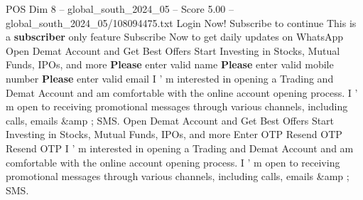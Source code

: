 \begin{textsample}{POS Dim 8 – global\_south\_2024\_05 – Score 5.00 – global\_south\_2024\_05/108094475.txt}
Login Now!
Subscribe to continue This is a \textbf{subscriber} only feature Subscribe Now to get daily updates on WhatsApp Open Demat Account and Get Best Offers Start Investing in Stocks, Mutual Funds, IPOs, and more \textbf{Please} enter valid name \textbf{Please} enter valid mobile number \textbf{Please} enter valid email I ' m interested in opening a Trading and Demat Account and am comfortable with the online account opening process.
I ' m open to receiving promotional messages through various channels, including calls, emails \&amp ; SMS.
Open Demat Account and Get Best Offers Start Investing in Stocks, Mutual Funds, IPOs, and more Enter OTP Resend OTP Resend OTP I ' m interested in opening a Trading and Demat Account and am comfortable with the online account opening process.
I ' m open to receiving promotional messages through various channels, including calls, emails \&amp ; SMS.

\end{textsample}
